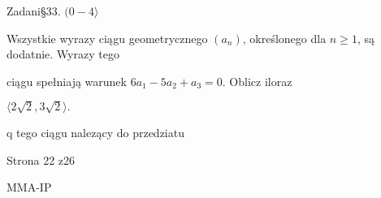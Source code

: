 \documentclass[a4paper,12pt]{article}
\begin{document}
Zadani\S 33. $(0-4\rangle$

Wszystkie wyrazy ciągu geometrycznego $(a_{n})$, określonego dla $n\geq 1$, są dodatnie. Wyrazy tego

ciągu spełniają warunek $6a_{1}-5a_{2}+a_{3}=0$. Oblicz iloraz

$\langle 2\sqrt{2}, 3\sqrt{2}\rangle.$

q tego ciągu nalezący do przedziatu

Strona 22 z26

MMA-IP
\end{document}
